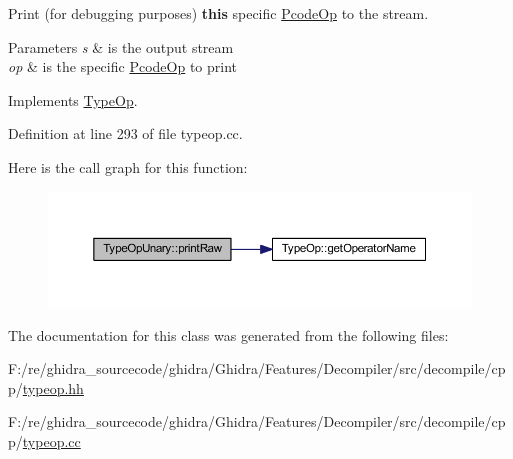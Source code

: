 Print (for debugging purposes) {\bfseries{this}} specific \mbox{\hyperlink{class_pcode_op}{Pcode\+Op}} to the stream. 


\begin{DoxyParams}{Parameters}
{\em s} & is the output stream \\
\hline
{\em op} & is the specific \mbox{\hyperlink{class_pcode_op}{Pcode\+Op}} to print \\
\hline
\end{DoxyParams}


Implements \mbox{\hyperlink{class_type_op_a60717e486917a30cc7cb6e3ce02585e1}{Type\+Op}}.



Definition at line 293 of file typeop.\+cc.

Here is the call graph for this function\+:
\nopagebreak
\begin{figure}[H]
\begin{center}
\leavevmode
\includegraphics[width=350pt]{class_type_op_unary_a05cfe8c1ca862ce3d1e5b994ab98746b_cgraph}
\end{center}
\end{figure}


The documentation for this class was generated from the following files\+:\begin{DoxyCompactItemize}
\item 
F\+:/re/ghidra\+\_\+sourcecode/ghidra/\+Ghidra/\+Features/\+Decompiler/src/decompile/cpp/\mbox{\hyperlink{typeop_8hh}{typeop.\+hh}}\item 
F\+:/re/ghidra\+\_\+sourcecode/ghidra/\+Ghidra/\+Features/\+Decompiler/src/decompile/cpp/\mbox{\hyperlink{typeop_8cc}{typeop.\+cc}}\end{DoxyCompactItemize}
